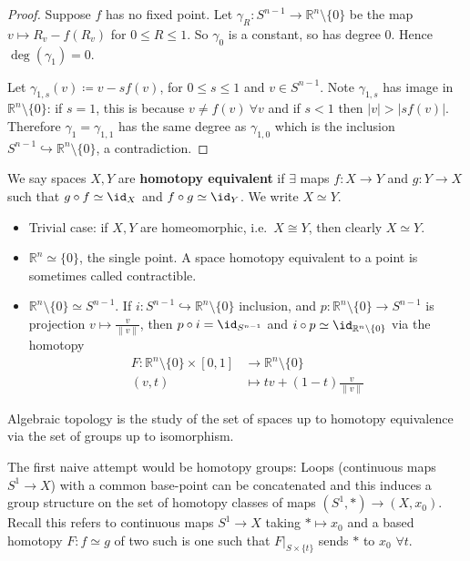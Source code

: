 \documentclass{article}
\begin{document}
\begin{proof}
  Suppose $f$ has no fixed point.
  Let $\gamma_R: S^{n-1} \to \mathbb{R}^n \setminus \{0\}$ be the map $v \mapsto R_v - f(R_v)$ for $0 \leq R \leq 1$. So $\gamma_0$ is a constant, so has degree 0.
  Hence $\deg(\gamma_1) = 0$.

  Let $\gamma_{1,s}(v) \coloneqq v - s f(v)$, for $0 \leq s \leq 1$ and $v \in S^{n-1}$.
  Note $\gamma_{1,s}$ has image in $\mathbb{R}^n \setminus \{0\}$: if $s=1$, this is because $v \neq f(v) \ \forall v$ and if $s < 1$ then $|v| > |s f(v)|$.
  Therefore $\gamma_1 = \gamma_{1,1}$ has the same degree as $\gamma_{1,0}$ which is the inclusion $S^{n-1} \hookrightarrow \mathbb{R}^n\setminus\{0\}$, a contradiction.
\end{proof}
\begin{defi}
  We say spaces $X,Y$ are \textbf{homotopy equivalent} if $\exists$ maps $f : X \to Y$ and $g: Y \to X$ such that $g \circ f \simeq \id_X$ and $f \circ g \simeq \id_Y$. We write $X \simeq Y$.
\end{defi}
\begin{eg}\leavevmode
  \begin{itemize}
    \item Trivial case: if $X,Y$ are homeomorphic, i.e.\ $X \cong Y$, then clearly $X \simeq Y$.

    \item $\mathbb{R}^n \simeq \{0\}$, the single point. A space homotopy equivalent to a point is sometimes called contractible.
    \item $\mathbb{R}^n \setminus \{0\} \simeq S^{n-1}$.
      If $i: S^{n-1} \hookrightarrow \mathbb{R}^n \setminus \{0\}$ inclusion, and $p: \mathbb{R}^n \setminus \{0\} \to S^{n-1}$ is projection $v \mapsto \frac{v}{\|v\|}$, then $p \circ i = \id_{S^{n-1}}$ and $i \circ p \simeq \id_{\mathbb{R}^n \setminus \{0\}}$ via the homotopy
      \begin{align*}
        F: \mathbb{R}^n \setminus \{0\} \times [0,1] &\longrightarrow \mathbb{R}^n \setminus \{0\} \\
        (v,t) &\longmapsto t v + (1-t) \frac{v}{\|v\|}
      \end{align*}
  \end{itemize}
\end{eg}
Algebraic topology is the study of the set of spaces up to homotopy equivalence via the set of groups up to isomorphism.

The first naive attempt would be homotopy groups:
Loops (continuous maps $S^1 \to X$) with a common base-point can be concatenated and this induces a group structure on the set of homotopy classes of maps $(S^1, *) \to (X, x_0)$.
Recall this refers to continuous maps $S^1 \to X$ taking $* \mapsto x_0$ and a based homotopy $F : f \simeq g$ of two such is one such that $F |_{S \times \{t\}}$ sends $*$ to $x_0$ $\forall t$.
\end{document}
